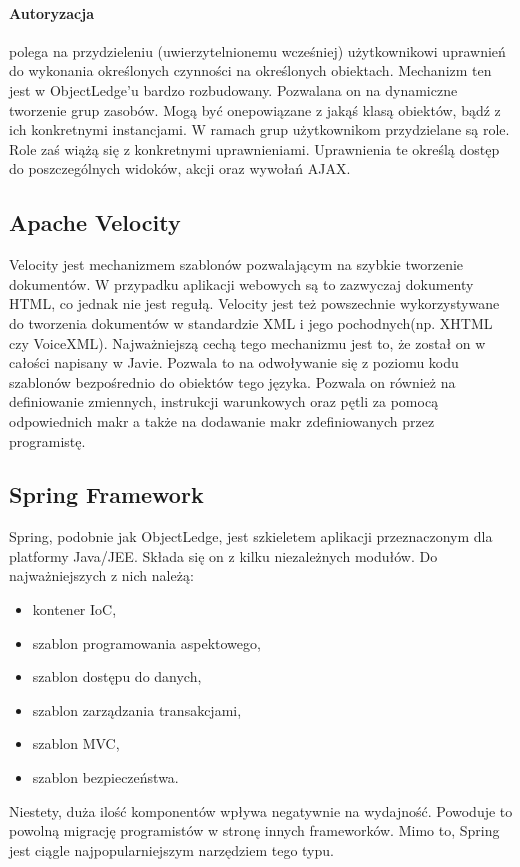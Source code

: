 \paragraph{Autoryzacja} polega na przydzieleniu (uwierzytelnionemu wcześniej) użytkownikowi uprawnień do wykonania określonych czynności na określonych obiektach. Mechanizm ten jest w ObjectLedge'u bardzo rozbudowany. Pozwalana on na dynamiczne tworzenie grup zasobów. Mogą być onepowiązane z jakąś klasą obiektów, bądź z ich konkretnymi instancjami. W ramach grup użytkownikom przydzielane są role. Role zaś wiążą się z konkretnymi uprawnieniami. Uprawnienia te określą dostęp do poszczególnych widoków, akcji oraz wywołań AJAX.

\subsection[Apache Velocity][Apache Velocity]{Apache Velocity}
Velocity jest mechanizmem szablonów pozwalającym na szybkie tworzenie dokumentów. W przypadku aplikacji webowych są to zazwyczaj dokumenty HTML, co jednak nie jest regułą. Velocity jest też powszechnie wykorzystywane do tworzenia dokumentów w standardzie XML i jego pochodnych(np. XHTML czy VoiceXML). Najważniejszą cechą tego mechanizmu jest to, że został on w całości napisany w Javie. Pozwala to na odwoływanie się z poziomu kodu szablonów bezpośrednio do obiektów tego języka. Pozwala on również na definiowanie zmiennych, instrukcji warunkowych oraz pętli za pomocą odpowiednich makr a także na dodawanie makr zdefiniowanych przez programistę.

\subsection[Spring Framework][Spring Framework]{Spring Framework}
Spring, podobnie jak ObjectLedge, jest szkieletem aplikacji przeznaczonym dla platformy Java/JEE. Składa się on z kilku niezależnych modułów. Do najważniejszych z nich należą:
\begin{itemize}
	\item kontener IoC, 
	\item szablon programowania aspektowego,
	\item szablon dostępu do danych,
	\item szablon zarządzania transakcjami,
	\item szablon MVC,
	\item szablon bezpieczeństwa.
\end{itemize}
Niestety, duża ilość komponentów wpływa negatywnie na wydajność. Powoduje to powolną migrację programistów w stronę innych frameworków. Mimo to, Spring jest ciągle najpopularniejszym narzędziem tego typu.

